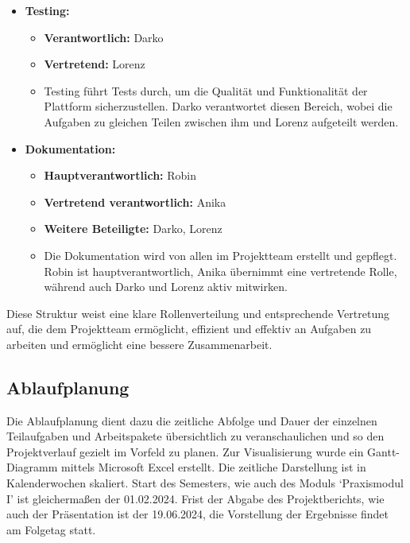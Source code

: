 \begin{itemize}[itemsep=1em, leftmargin=*]
    \item \textbf{Testing:}
    \begin{itemize}
        \item \textbf{Verantwortlich:} Darko
        \item \textbf{Vertretend:} Lorenz
        \item Testing führt Tests durch, um die Qualität und Funktionalität der Plattform sicherzustellen.
        Darko verantwortet diesen Bereich, wobei die Aufgaben zu gleichen Teilen zwischen ihm und Lorenz aufgeteilt werden.
    \end{itemize}

    \item \textbf{Dokumentation:}
    \begin{itemize}
        \item \textbf{Hauptverantwortlich:} Robin
        \item \textbf{Vertretend verantwortlich:} Anika
        \item \textbf{Weitere Beteiligte:} Darko, Lorenz
        \item Die Dokumentation wird von allen im Projektteam erstellt und gepflegt.
        Robin ist hauptverantwortlich, Anika übernimmt eine vertretende Rolle, während auch Darko und Lorenz aktiv mitwirken.
    \end{itemize}
\end{itemize}


Diese Struktur weist eine klare Rollenverteilung und entsprechende Vertretung auf, die dem Projektteam ermöglicht, effizient und effektiv an Aufgaben zu arbeiten und ermöglicht eine bessere Zusammenarbeit.

\newpage

\subsection{Ablaufplanung}\label{subsec:ablaufplan}

Die Ablaufplanung dient dazu die zeitliche Abfolge und Dauer der einzelnen Teilaufgaben und Arbeitspakete übersichtlich zu veranschaulichen und so den Projektverlauf gezielt im Vorfeld zu planen.
Zur Visualisierung wurde ein Gantt-Diagramm mittels Microsoft Excel erstellt.
Die zeitliche Darstellung ist in Kalenderwochen skaliert.
Start des Semesters, wie auch des Moduls `Praxismodul I' ist gleichermaßen der 01.02.2024.
Frist der Abgabe des Projektberichts, wie auch der Präsentation ist der 19.06.2024, die Vorstellung der Ergebnisse findet am Folgetag statt.

